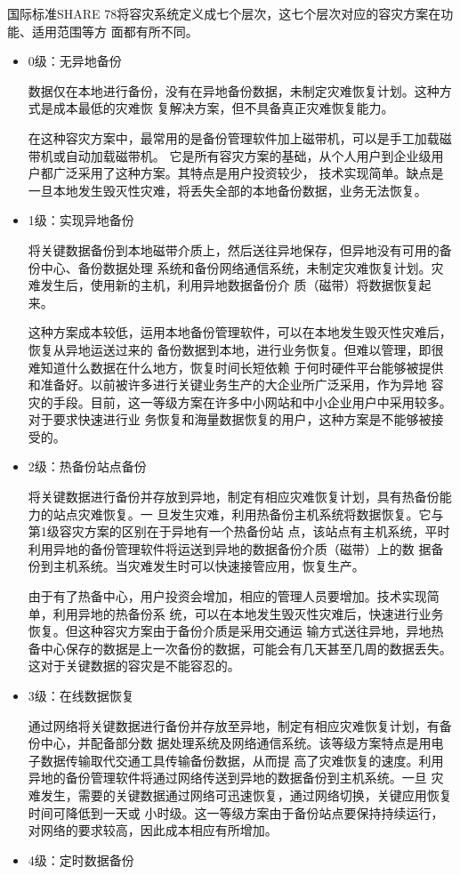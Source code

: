 \documentclass[cyan]{elegantnote}
\begin{document}
国际标准SHARE 78将容灾系统定义成七个层次，这七个层次对应的容灾方案在功能、适用范围等方
面都有所不同。
\begin{itemize}
    \item 0级：无异地备份

数据仅在本地进行备份，没有在异地备份数据，未制定灾难恢复计划。这种方式是成本最低的灾难恢
复解决方案，但不具备真正灾难恢复能力。

在这种容灾方案中，最常用的是备份管理软件加上磁带机，可以是手工加载磁带机或自动加载磁带机。
它是所有容灾方案的基础，从个人用户到企业级用户都广泛采用了这种方案。其特点是用户投资较少，
技术实现简单。缺点是一旦本地发生毁灭性灾难，将丢失全部的本地备份数据，业务无法恢复。
    \item 1级：实现异地备份

将关键数据备份到本地磁带介质上，然后送往异地保存，但异地没有可用的备份中心、备份数据处理
系统和备份网络通信系统，未制定灾难恢复计划。灾难发生后，使用新的主机，利用异地数据备份介
质（磁带）将数据恢复起来。

这种方案成本较低，运用本地备份管理软件，可以在本地发生毁灭性灾难后，恢复从异地运送过来的
备份数据到本地，进行业务恢复。但难以管理，即很难知道什么数据在什么地方，恢复时间长短依赖
于何时硬件平台能够被提供和准备好。以前被许多进行关键业务生产的大企业所广泛采用，作为异地
容灾的手段。目前，这一等级方案在许多中小网站和中小企业用户中采用较多。对于要求快速进行业
务恢复和海量数据恢复的用户，这种方案是不能够被接受的。
    \item 2级：热备份站点备份

将关键数据进行备份并存放到异地，制定有相应灾难恢复计划，具有热备份能力的站点灾难恢复。一
旦发生灾难，利用热备份主机系统将数据恢复。它与第1级容灾方案的区别在于异地有一个热备份站
点，该站点有主机系统，平时利用异地的备份管理软件将运送到异地的数据备份介质（磁带）上的数
据备份到主机系统。当灾难发生时可以快速接管应用，恢复生产。

由于有了热备中心，用户投资会增加，相应的管理人员要增加。技术实现简单，利用异地的热备份系
统，可以在本地发生毁灭性灾难后，快速进行业务恢复。但这种容灾方案由于备份介质是采用交通运
输方式送往异地，异地热备中心保存的数据是上一次备份的数据，可能会有几天甚至几周的数据丢失。
这对于关键数据的容灾是不能容忍的。
    \item 3级：在线数据恢复

通过网络将关键数据进行备份并存放至异地，制定有相应灾难恢复计划，有备份中心，并配备部分数
据处理系统及网络通信系统。该等级方案特点是用电子数据传输取代交通工具传输备份数据，从而提
高了灾难恢复的速度。利用异地的备份管理软件将通过网络传送到异地的数据备份到主机系统。一旦
灾难发生，需要的关键数据通过网络可迅速恢复，通过网络切换，关键应用恢复时间可降低到一天或
小时级。这一等级方案由于备份站点要保持持续运行，对网络的要求较高，因此成本相应有所增加。
    \item 4级：定时数据备份


\end{itemize}
\end{document}
